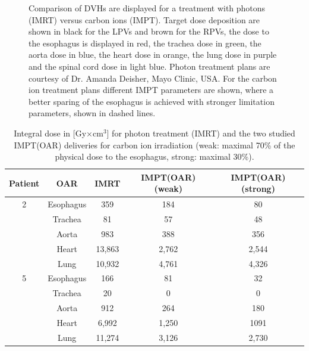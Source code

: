 \begin{figure}[H]
\begin{center}
{ }
 \end{center}
\caption{Comparison of DVHs are displayed for a treatment with photons (IMRT) versus carbon ions (IMPT). 
Target dose deposition are shown in black for the LPVs and brown for the RPVs, the dose to the esophagus is displayed in red, the trachea dose 
in green, the aorta dose in blue, the heart dose in orange, the lung dose in purple and the spinal cord dose in light blue. Photon treatment 
plans are courtesy of Dr. Amanda Deisher, Mayo Clinic, USA. For the carbon ion treatment plans different IMPT parameters are shown, where 
a better sparing of the esophagus is achieved with stronger limitation parameters, shown in dashed lines.}
\label{dvh_patients_photon_vs_carbon}
\end{figure}

\vspace*{-0.8cm}

\begin{table}[H]
  \centering
  \caption{Integral dose in [Gy$\times$cm$^{3}$] for photon treatment (IMRT) and the two studied IMPT(OAR) deliveries for carbon ion 
  irradiation (weak: maximal 70\% of the physical dose to the esophagus, strong: maximal 30\%).}
  \begin{tabular}{|c|c||c||c|c|}
    \hline\hline
    Patient & OAR & IMRT & IMPT(OAR) (weak) & IMPT(OAR) (strong)\\
    \hline
    2 & Esophagus & 359 & 184 & 80 \\
    & Trachea & 81 & 57 & 48 \\
    & Aorta & 983 & 388 & 356 \\
    & Heart & 13,863 & 2,762 & 2,544 \\
    & Lung & 10,932 & 4,761 & 4,326 \\
    \hline
    5 & Esophagus & 166 & 81 & 32 \\
    & Trachea & 20 & 0 & 0 \\
    & Aorta & 912 & 264 & 180 \\
    & Heart & 6,992 & 1,250 & 1091 \\
    & Lung & 11,274 & 3,126 & 2,730 \\
    \hline\hline
  \end{tabular}
  \label{tab:SID}
\end{table}

